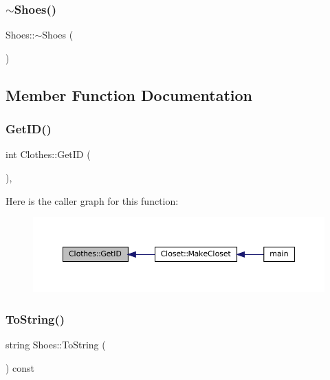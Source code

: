 \subsubsection{\texorpdfstring{$\sim$\+Shoes()}{~Shoes()}}
{\footnotesize\ttfamily Shoes\+::$\sim$\+Shoes (\begin{DoxyParamCaption}{ }\end{DoxyParamCaption})\hspace{0.3cm}{\ttfamily [virtual]}}



\subsection{Member Function Documentation}
\mbox{\label{classClothes_a3f6dac172f333126d19010f85ec44e4c}} 
\subsubsection{\texorpdfstring{Get\+I\+D()}{GetID()}}
{\footnotesize\ttfamily int Clothes\+::\+Get\+ID (\begin{DoxyParamCaption}{ }\end{DoxyParamCaption})\hspace{0.3cm}{\ttfamily [inline]}, {\ttfamily [inherited]}}

Here is the caller graph for this function\+:\nopagebreak
\begin{figure}[H]
\begin{center}
\leavevmode
\includegraphics[width=350pt]{classClothes_a3f6dac172f333126d19010f85ec44e4c_icgraph}
\end{center}
\end{figure}
\mbox{\label{classShoes_a9b1bcc00ec7ef920d34bf9193c96a1ce}} 
\subsubsection{\texorpdfstring{To\+String()}{ToString()}}
{\footnotesize\ttfamily string Shoes\+::\+To\+String (\begin{DoxyParamCaption}{ }\end{DoxyParamCaption}) const\hspace{0.3cm}{\ttfamily [virtual]}}

